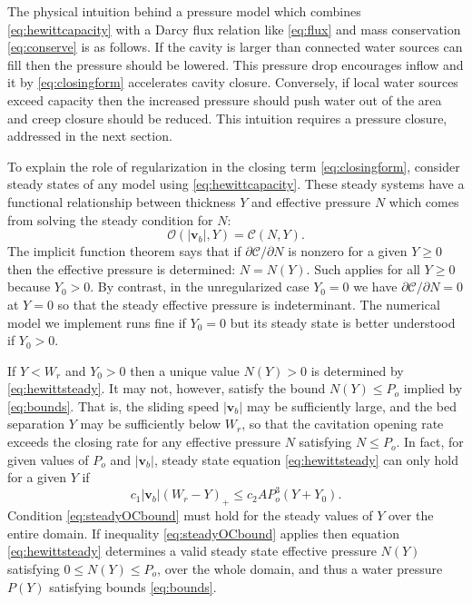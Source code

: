 \documentclass[11pt,final]{amsart}
\newcommand\bv{\mathbf{v}}
\begin{document}
The physical intuition behind a pressure model which combines \eqref{eq:hewittcapacity} with a Darcy flux relation like \eqref{eq:flux} and mass conservation \eqref{eq:conserve} is as follows.  If the cavity is larger than connected water sources can fill then the pressure should be lowered.  This pressure drop encourages inflow and it by \eqref{eq:closingform} accelerates cavity closure.  Conversely, if local water sources exceed capacity then the increased pressure should push water out of the area and creep closure should be reduced.  This intuition requires a pressure closure, addressed in the next section.

To explain the role of regularization in the closing term \eqref{eq:closingform}, consider steady states of any model using \eqref{eq:hewittcapacity}.  These steady systems have a functional relationship between thickness $Y$ and effective pressure $N$ which comes from solving the steady condition for $N$:
\begin{equation}
\mathcal{O}(|\bv_b|,Y) = \mathcal{C}(N,Y). \label{eq:hewittsteady}
\end{equation}
The implicit function theorem says that if $\partial\mathcal{C}/\partial N$ is nonzero for a given $Y\ge 0$ then the effective pressure is determined: $N=N(Y)$.  Such applies for all $Y\ge 0$ because $Y_0>0$.  By contrast, in the unregularized case $Y_0=0$ we have $\partial\mathcal{C}/\partial N=0$ at $Y=0$ so that the steady effective pressure is indeterminant.  The numerical model we implement runs fine if $Y_0=0$ but its steady state is better understood if $Y_0>0$.

If $Y<W_r$ and $Y_0>0$ then a unique value $N(Y)>0$ is determined by \eqref{eq:hewittsteady}.  It may not, however, satisfy the bound $N(Y) \le P_o$ implied by \eqref{eq:bounds}.  That is, the sliding speed $|\bv_b|$ may be sufficiently large, and the bed separation $Y$ may be sufficiently below $W_r$, so that the cavitation opening rate exceeds the closing rate for any effective pressure $N$ satisfying $N\le P_o$.  In fact, for given values of $P_o$ and $|\bv_b|$, steady state equation \eqref{eq:hewittsteady} can only hold for a given $Y$ if
\begin{equation}
c_1 |\bv_b| (W_r - Y)_+ \le c_2 A P_o^3 (Y+Y_0). \label{eq:steadyOCbound}
\end{equation}
Condition \eqref{eq:steadyOCbound} must hold for the steady values of $Y$ over the entire domain.  If inequality \eqref{eq:steadyOCbound} applies then equation \eqref{eq:hewittsteady} determines a valid steady state effective pressure $N(Y)$ satisfying $0\le N(Y) \le P_o$, over the whole domain, and thus a water pressure $P(Y)$ satisfying bounds \eqref{eq:bounds}.
\end{document}
